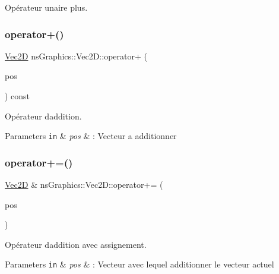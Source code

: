 Opérateur unaire plus. 

\mbox{\label{classns_graphics_1_1_vec2_d_a59d565535347c6d0974be9a2333a5806}} 
\subsubsection{\texorpdfstring{operator+()}{operator+()}\hspace{0.1cm}{\footnotesize\ttfamily [2/2]}}
{\footnotesize\ttfamily \hyperlink{classns_graphics_1_1_vec2_d}{Vec2D} ns\+Graphics\+::\+Vec2\+D\+::operator+ (\begin{DoxyParamCaption}\item[{const \hyperlink{classns_graphics_1_1_vec2_d}{Vec2D} \&}]{pos }\end{DoxyParamCaption}) const}



Opérateur d\textquotesingle{}addition. 


\begin{DoxyParams}[1]{Parameters}
\mbox{\tt in}  & {\em pos} & \+: Vecteur a additionner \\
\hline
\end{DoxyParams}
\mbox{\label{classns_graphics_1_1_vec2_d_aafd8b68f1cb9dcfcf92a96714e58c5ec}} 
\subsubsection{\texorpdfstring{operator+=()}{operator+=()}}
{\footnotesize\ttfamily \hyperlink{classns_graphics_1_1_vec2_d}{Vec2D} \& ns\+Graphics\+::\+Vec2\+D\+::operator+= (\begin{DoxyParamCaption}\item[{const \hyperlink{classns_graphics_1_1_vec2_d}{Vec2D} \&}]{pos }\end{DoxyParamCaption})}



Opérateur d\textquotesingle{}addition avec assignement. 


\begin{DoxyParams}[1]{Parameters}
\mbox{\tt in}  & {\em pos} & \+: Vecteur avec lequel additionner le vecteur actuel \\
\hline
\end{DoxyParams}
\mbox{\label{classns_graphics_1_1_vec2_d_a3cc10af3b04df2c6bf85460ced5c63a7}} 
